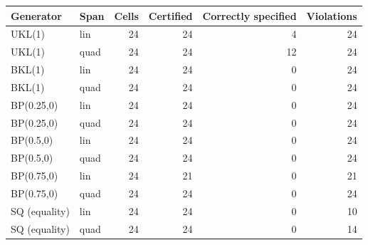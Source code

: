 \begin{tabular}{llrrrr}
\hline
Generator & Span & Cells & Certified & Correctly specified & Violations \\
\hline
UKL(1) & lin & 24 & 24 & 4 & 24 \\
UKL(1) & quad & 24 & 24 & 12 & 24 \\
BKL(1) & lin & 24 & 24 & 0 & 24 \\
BKL(1) & quad & 24 & 24 & 0 & 24 \\
BP(0.25,0) & lin & 24 & 24 & 0 & 24 \\
BP(0.25,0) & quad & 24 & 24 & 0 & 24 \\
BP(0.5,0) & lin & 24 & 24 & 0 & 24 \\
BP(0.5,0) & quad & 24 & 24 & 0 & 24 \\
BP(0.75,0) & lin & 24 & 21 & 0 & 21 \\
BP(0.75,0) & quad & 24 & 24 & 0 & 24 \\
\hline
SQ (equality) & lin & 24 & 24 & 0 & 10 \\
SQ (equality) & quad & 24 & 24 & 0 & 14 \\
\hline
\end{tabular}
